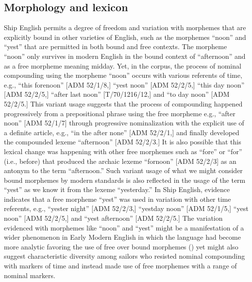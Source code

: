 \subsection{{Morphology} {and} {lexicon}}%

  Ship English permits a degree of freedom and variation with morphemes that are explicitly bound in other varieties of English, such as the morphemes “noon” and “yest” that are permitted in both bound and free contexts. The morpheme “noon” only survives in modern English in the bound context of “afternoon” and as a free morpheme meaning midday. Yet, in the corpus, the process of nominal compounding using the morpheme “noon” occurs with various referents of time, e.g., “this forenoon” [ADM 52/1/8,] “yest noon” [ADM 52/2/5,] “this day noon” [ADM 52/2/5,] “after last noon” [T/70/1216/12,] and “to day noon” [ADM 52/2/5.] This variant usage suggests that the process of compounding happened progressively from a prepositional phrase using the free morpheme e.g., “after noon” [ADM 52/1/7] through progressive nominalization with the explicit use of a definite article, e.g., “in the after none” [ADM 52/2/1,] and finally developed the compounded lexeme “afternoon” [ADM 52/2/3.] It is also possible that this lexical change was happening with other free morphemes such as “fore” or “for” (i.e., before) that produced the archaic lexeme “fornoon” [ADM 52/2/3] as an antonym to the term “afternoon.” Such variant usage of what we might consider bound morphemes by modern standards is also reflected in the usage of the term “yest” as we know it from the lexeme “yesterday.”  In Ship English, evidence indicates that a free morpheme “yest” was used in variation with other time referents, e.g., “yester night” [ADM 52/2/3,] “yestday noon” [ADM 52/1/5,] “yest noon” [ADM 52/2/5,] and “yest afternoon” [ADM 52/2/5.] The variation evidenced with morphemes like “noon” and “yest” might be a manifestation of a wider phenomenon in Early Modern English in which the language had become more analytic favoring the use of free over bound morphemes (\citealt{MillwardHayes2012}) yet might also suggest characteristic diversity among sailors who resisted nominal compounding with markers of time and instead made use of free morphemes with a range of nominal markers.  

